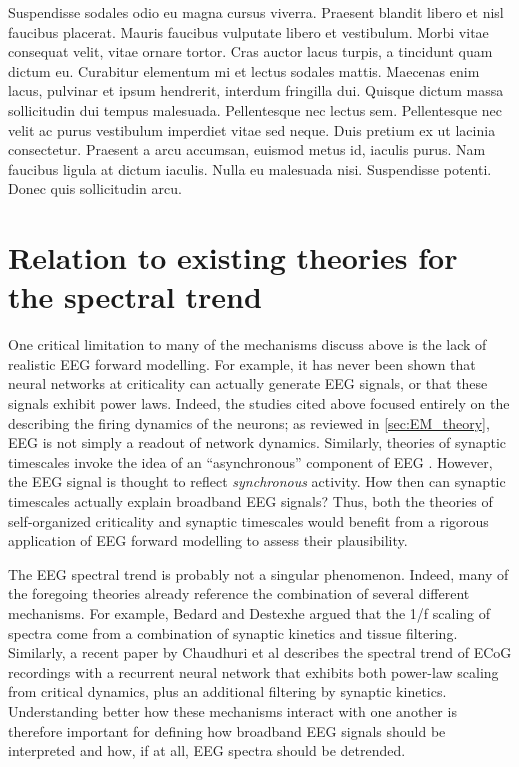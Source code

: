 Suspendisse sodales odio eu magna cursus viverra. Praesent blandit libero et nisl faucibus placerat. Mauris faucibus vulputate libero et vestibulum. Morbi vitae consequat velit, vitae ornare tortor. Cras auctor lacus turpis, a tincidunt quam dictum eu. Curabitur elementum mi et lectus sodales mattis. Maecenas enim lacus, pulvinar et ipsum hendrerit, interdum fringilla dui. Quisque dictum massa sollicitudin dui tempus malesuada. Pellentesque nec lectus sem. Pellentesque nec velit ac purus vestibulum imperdiet vitae sed neque. Duis pretium ex ut lacinia consectetur. Praesent a arcu accumsan, euismod metus id, iaculis purus. Nam faucibus ligula at dictum iaculis. Nulla eu malesuada nisi. Suspendisse potenti. Donec quis sollicitudin arcu.

\section{Relation to existing theories for the spectral trend}

One critical limitation to many of the mechanisms discuss above is the lack of realistic EEG forward modelling. For example, it has never been shown that neural networks at criticality can actually generate EEG signals, or that these signals exhibit power laws. Indeed, the studies cited above focused entirely on the describing the firing dynamics of the neurons; as reviewed in \autoref{sec:EM_theory}, EEG is not simply a readout of network dynamics. Similarly, theories of synaptic timescales invoke the idea of an ``asynchronous'' component of EEG \cite{Miller2009}. However, the EEG signal is thought to reflect \textit{synchronous} activity. How then can synaptic timescales actually explain broadband EEG signals? Thus, both the theories of self-organized criticality and synaptic timescales would benefit from a rigorous application of EEG forward modelling to assess their plausibility.

The EEG spectral trend is probably not a singular phenomenon. Indeed, many of the foregoing theories already reference the combination of several different mechanisms. For example, Bedard and Destexhe \cite{Bedard2006} argued that the 1/f scaling of spectra come from a combination of synaptic kinetics and tissue filtering. Similarly, a recent paper by Chaudhuri et al \cite{Chaudhuri2018} describes the spectral trend of ECoG recordings with a recurrent neural network that exhibits both power-law scaling from critical dynamics, plus an additional filtering by synaptic kinetics. Understanding better how these mechanisms interact with one another is therefore important for defining how broadband EEG signals should be interpreted and how, if at all, EEG spectra should be detrended.

